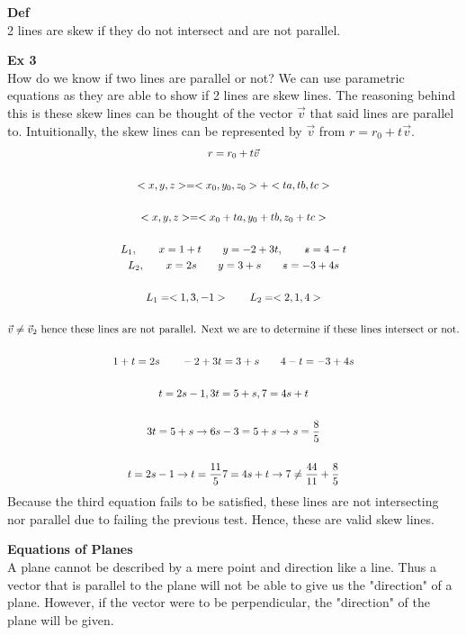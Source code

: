 \documentclass{article}
\begin{document}
  \textbf{Def}\\
  2 lines are skew if they do not intersect and are not parallel.

  \textbf{Ex 3}\\
  How do we know if two lines are parallel or not? We can use parametric equations as they are able to show if 2 lines are skew lines. The reasoning behind this is these skew lines can be thought of the vector $ \vec{v} $ that said lines are parallel to. Intuitionally, the skew lines can be represented by $ \vec{v} $ from $ r=r_{0}+t \vec{v}  $.  
  \[
    \begin{gathered}
      r = r_{0}+t \vec{v}\\
      ~\\
      <x,y,z>=<x_{0},y_{0},z_{0}>+<ta,tb,tc>\\
      ~\\
      < x, y, z> = < x_{0}+ta, y_{0}+tb ,z_{0}+tc  >\\
      ~\\
    L_{1},\qquad x=1+t \qquad y=-2+3t, \qquad \zstroke=4-t\\
    L_{2},\qquad x=2s \qquad y=3+s \qquad \zstroke=-3+4s\\
    ~\\
    L_{1}=< 1, 3, -1> \qquad L_{2}=< 2, 1, 4> \\
    ~\\
    \vec{v} \neq \vec{v}_{2} \text{ hence these lines are not parallel. Next we are to determine if these lines intersect or not.}\\
    ~\\
    1+t=2s \qquad -2+3t = 3+s \qquad 4-t=-3+4s\\
    ~\\
    t = 2s-1, 3t=5+s, 7=4s+t\\
    ~\\
    3t=5+s\to 6s-3=5+s \to s= \frac{8}{5}\\
    ~\\
    t=2s-1\to t= \frac{11}{5} 
    7=4s+t\to 7 \neq \frac{44}{11}+\frac{8}{5}\\
    \end{gathered}
  \]
  Because the third equation fails to be satisfied, these lines are not intersecting nor parallel due to failing the previous test. Hence, these are valid skew lines.

  \textbf{Equations of Planes}\\
  A plane cannot be described by a mere point and direction like a line. Thus a vector that is parallel to the plane will not be able to give us the "direction" of a plane. However, if the vector were to be perpendicular, the "direction" of the plane will be given. 
\end{document}
